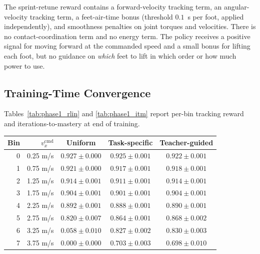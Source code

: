 \documentclass[a4paper,11pt]{article}
\begin{document}
    The sprint-retune reward contains a forward-velocity tracking term, an angular-velocity tracking term, a feet-air-time bonus (threshold $0.1$~s per foot, applied independently), and smoothness penalties on joint torques and velocities. There is no contact-coordination term and no energy term. The policy receives a positive signal for moving forward at the commanded speed and a small bonus for lifting each foot, but no guidance on \textit{which} feet to lift in which order or how much power to use.

    \subsection{Training-Time Convergence}

    Tables~\ref{tab:phase1_rlin} and \ref{tab:phase1_itm} report per-bin tracking reward and iterations-to-mastery at end of training.

    \begin{center}
    \begin{tabular}{@{}r r c c c@{}}
    \toprule
    \textbf{Bin} & $v_x^{\mathrm{cmd}}$ & \textbf{Uniform} & \textbf{Task-specific} & \textbf{Teacher-guided} \\
    \midrule
    0 & 0.25 m/s & $0.927 \pm 0.000$ & $0.925 \pm 0.001$ & $0.922 \pm 0.001$ \\
    1 & 0.75 m/s & $0.921 \pm 0.000$ & $0.917 \pm 0.001$ & $0.918 \pm 0.001$ \\
    2 & 1.25 m/s & $0.914 \pm 0.001$ & $0.911 \pm 0.001$ & $0.914 \pm 0.001$ \\
    3 & 1.75 m/s & $0.904 \pm 0.001$ & $0.901 \pm 0.001$ & $0.904 \pm 0.001$ \\
    4 & 2.25 m/s & $0.892 \pm 0.001$ & $0.888 \pm 0.001$ & $0.890 \pm 0.001$ \\
    5 & 2.75 m/s & $0.820 \pm 0.007$ & $0.864 \pm 0.001$ & $0.868 \pm 0.002$ \\
    6 & 3.25 m/s & $0.058 \pm 0.010$ & $0.827 \pm 0.002$ & $0.830 \pm 0.003$ \\
    7 & 3.75 m/s & $0.000 \pm 0.000$ & $0.703 \pm 0.003$ & $0.698 \pm 0.010$ \\
    \bottomrule
    \end{tabular}
    \label{tab:phase1_rlin}
    \end{center}
\end{document}
